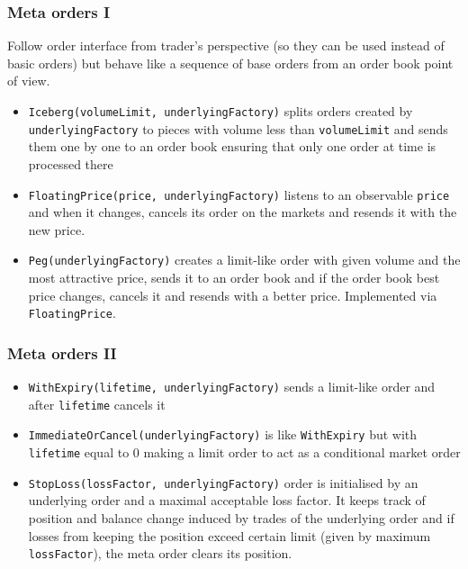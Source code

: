\documentclass{beamer}
\begin{document}
\begin{frame}
\frametitle{Meta orders I}
Follow order interface from trader's perspective (so they can be used instead of basic orders) but behave like a sequence of base orders from an order book point of view.
\begin{itemize}
  \item \texttt{Iceberg(volumeLimit, underlyingFactory)} splits orders created by \texttt{underlyingFactory} to pieces with volume less than \texttt{volumeLimit} and sends them one by one to an order book ensuring that only one order at time is processed there
  \item \texttt{FloatingPrice(price, underlyingFactory)} listens to an observable \texttt{price} and when it changes, cancels its order on the markets and resends it with the new price.  
  \item \texttt{Peg(underlyingFactory)} creates a limit-like order with given volume and the most attractive price, sends it to an order book and if the order book best price changes, cancels it and resends with a better price. Implemented via \texttt{FloatingPrice}.
\end{itemize}
\end{frame}

\begin{frame}
\frametitle{Meta orders II}
\begin{itemize}
  \item \texttt{WithExpiry(lifetime, underlyingFactory)} sends a limit-like order and after \texttt{lifetime} cancels it
  \item \texttt{ImmediateOrCancel(underlyingFactory)} is like \texttt{WithExpiry} but with \texttt{lifetime} equal to 0 making a limit order to act as a conditional market order
  \item \texttt{StopLoss(lossFactor, underlyingFactory)} order is initialised by an underlying order and a maximal acceptable loss factor.
      It keeps track of position and balance change induced by trades of the underlying order and
      if losses from keeping the position exceed certain limit (given by maximum \texttt{lossFactor}),
      the meta order clears its position.
\end{itemize}
\end{frame}
\end{document}
